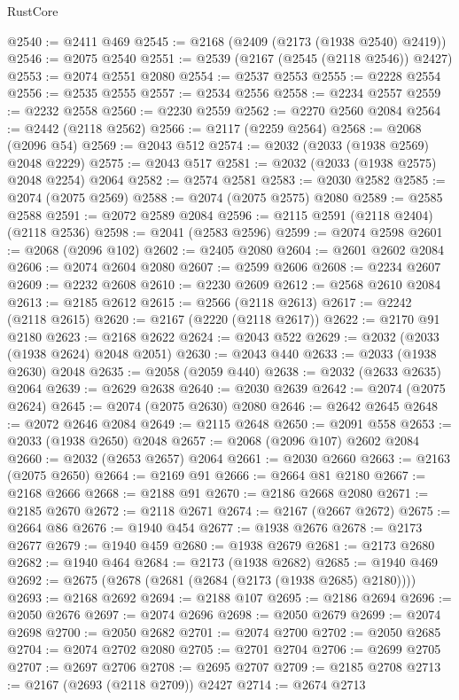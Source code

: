 \begin{lexlean}{RustCore}
\begin{coremodule}
@2540 := @2411 @469
@2545 := @2168 (@2409 (@2173 (@1938 @2540) @2419))
@2546 := @2075 @2540
@2551 := @2539 (@2167 (@2545 (@2118 @2546)) @2427)
@2553 := @2074 @2551 @2080
@2554 := @2537 @2553
@2555 := @2228 @2554
@2556 := @2535 @2555
@2557 := @2534 @2556
@2558 := @2234 @2557
@2559 := @2232 @2558
@2560 := @2230 @2559
@2562 := @2270 @2560 @2084
@2564 := @2442 (@2118 @2562)
@2566 := @2117 (@2259 @2564)
@2568 := @2068 (@2096 @54)
@2569 := @2043 @512
@2574 := @2032 (@2033 (@1938 @2569) @2048 @2229)
@2575 := @2043 @517
@2581 := @2032 (@2033 (@1938 @2575) @2048 @2254) @2064
@2582 := @2574 @2581
@2583 := @2030 @2582
@2585 := @2074 (@2075 @2569)
@2588 := @2074 (@2075 @2575) @2080
@2589 := @2585 @2588
@2591 := @2072 @2589 @2084
@2596 := @2115 @2591 (@2118 @2404) (@2118 @2536)
@2598 := @2041 (@2583 @2596)
@2599 := @2074 @2598
@2601 := @2068 (@2096 @102)
@2602 := @2405 @2080
@2604 := @2601 @2602 @2084
@2606 := @2074 @2604 @2080
@2607 := @2599 @2606
@2608 := @2234 @2607
@2609 := @2232 @2608
@2610 := @2230 @2609
@2612 := @2568 @2610 @2084
@2613 := @2185 @2612
@2615 := @2566 (@2118 @2613)
@2617 := @2242 (@2118 @2615)
@2620 := @2167 (@2220 (@2118 @2617))
@2622 := @2170 @91 @2180
@2623 := @2168 @2622
@2624 := @2043 @522
@2629 := @2032 (@2033 (@1938 @2624) @2048 @2051)
@2630 := @2043 @440
@2633 := @2033 (@1938 @2630) @2048
@2635 := @2058 (@2059 @440)
@2638 := @2032 (@2633 @2635) @2064
@2639 := @2629 @2638
@2640 := @2030 @2639
@2642 := @2074 (@2075 @2624)
@2645 := @2074 (@2075 @2630) @2080
@2646 := @2642 @2645
@2648 := @2072 @2646 @2084
@2649 := @2115 @2648
@2650 := @2091 @558
@2653 := @2033 (@1938 @2650) @2048
@2657 := @2068 (@2096 @107) @2602 @2084
@2660 := @2032 (@2653 @2657) @2064
@2661 := @2030 @2660
@2663 := @2163 (@2075 @2650)
@2664 := @2169 @91
@2666 := @2664 @81 @2180
@2667 := @2168 @2666
@2668 := @2188 @91
@2670 := @2186 @2668 @2080
@2671 := @2185 @2670
@2672 := @2118 @2671
@2674 := @2167 (@2667 @2672)
@2675 := @2664 @86
@2676 := @1940 @454
@2677 := @1938 @2676
@2678 := @2173 @2677
@2679 := @1940 @459
@2680 := @1938 @2679
@2681 := @2173 @2680
@2682 := @1940 @464
@2684 := @2173 (@1938 @2682)
@2685 := @1940 @469
@2692 := @2675 (@2678 (@2681 (@2684 (@2173 (@1938 @2685) @2180))))
@2693 := @2168 @2692
@2694 := @2188 @107
@2695 := @2186 @2694
@2696 := @2050 @2676
@2697 := @2074 @2696
@2698 := @2050 @2679
@2699 := @2074 @2698
@2700 := @2050 @2682
@2701 := @2074 @2700
@2702 := @2050 @2685
@2704 := @2074 @2702 @2080
@2705 := @2701 @2704
@2706 := @2699 @2705
@2707 := @2697 @2706
@2708 := @2695 @2707
@2709 := @2185 @2708
@2713 := @2167 (@2693 (@2118 @2709)) @2427
@2714 := @2674 @2713

\end{coremodule}
\end{lexlean}
